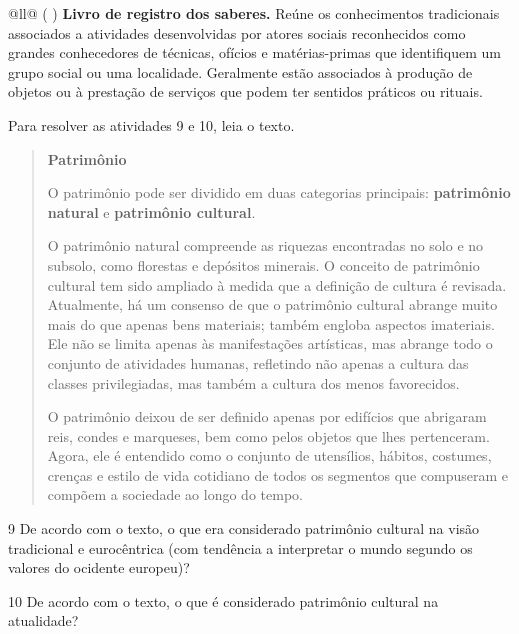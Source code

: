 \begin{itemize}
\begin{itemize}
\begin{escolha}[]{@{}ll@{}}
(  ) \textbf{Livro de registro dos saberes.} Reúne os 
conhecimentos tradicionais associados a atividades desenvolvidas 
por atores sociais reconhecidos como grandes
conhecedores de técnicas, ofícios e matérias-primas que identifiquem um
grupo social ou uma localidade. Geralmente estão associados à produção
de objetos ou à prestação de serviços que podem ter sentidos práticos ou
rituais.

Para resolver as atividades 9 e 10, leia o texto.

\begin{quote}
\textbf{Patrimônio}

O patrimônio pode ser dividido em duas categorias principais: \textbf{patrimônio 
natural} e \textbf{patrimônio cultural}.

O patrimônio natural compreende as riquezas encontradas no solo e no subsolo, 
como florestas e depósitos minerais. O conceito de patrimônio cultural tem sido 
ampliado à medida que a definição de cultura é revisada. Atualmente, há um 
consenso de que o patrimônio cultural abrange muito mais do que apenas bens 
materiais; também engloba aspectos imateriais. Ele não se limita apenas às 
manifestações artísticas, mas abrange todo o conjunto de atividades humanas, 
refletindo não apenas a cultura das classes privilegiadas, mas também a cultura 
dos menos favorecidos.

O patrimônio deixou de ser definido apenas por edifícios que abrigaram reis, condes 
e marqueses, bem como pelos objetos que lhes pertenceram. Agora, ele é entendido 
como o conjunto de utensílios, hábitos, costumes, crenças e estilo de vida cotidiano 
de todos os segmentos que compuseram e compõem a sociedade ao longo do tempo.

\end{quote}

\num{9} De acordo com o texto, o que era considerado patrimônio cultural na
  visão tradicional e eurocêntrica (com tendência a interpretar o mundo
  segundo os valores do ocidente europeu)?


\num{10} De acordo com o texto, o que é considerado patrimônio cultural na
  atualidade?



\end{escolha}
\end{itemize}
\end{itemize}
